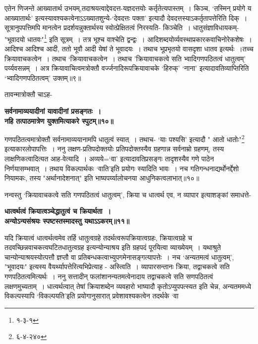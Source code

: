 {{एतेन णिजन्ते आख्यातार्थ उभयम्,तदाश्रयत्वाद्देवदत्त-यज्ञदत्तयोः कर्तृतेत्यपास्तम्~।
 किञ्च, `तस्मिन् प्रयोगे य आख्यातार्थः' इत्यस्यावश्यकत्वेनाऽऽख्यातशुन्ये-`देवदत्तः पक्ता' इत्यादौ देवदत्तस्याऽकर्तृतापत्तेरिति दिक्~।
 सूत्रानुपपत्तिमपि मानत्वेन प्रदर्शयन्नुक्तार्थस्य स्वोत्प्रेक्षितत्वं निरस्यति- किञ्चेति~।
धातुसंज्ञाविधायकम्-"भूवादयो धातवः"\footnote{१-३-१} इति सूत्रम्~।
तत्र भूश्च वाश्चेति द्वन्द्वः~।
आदिशब्दयोर्व्यवस्थाप्रकारकवाचिनोरेकशेषः~।
आदिश्च आदिश्च आदी, ततो भूवौ आदी येषां ते भूवादयः~।
तथाच भूप्रभृतयो वासदृशा धातव इत्यर्थः~।तच्च क्रियावाचकत्वेन~।
तथाच `क्रियावाचकत्वेन~।
तथाच 'क्रियावाचकत्वे सति भ्वादिगणपठितत्वं धातुत्वम्' पर्य्यवसन्नम्~।
अत्र क्रियावाचित्वमत्रोक्तौ वर्ज्जनादिरूपक्रियावाचके `हिरुक्' `नाना' इत्यादावतिव्याप्तिरिति `भ्वादिगणपठितत्वम्' उक्तम्॥९॥\par
तावन्मात्रोक्तौ चाऽह-
\begin{center}{\bfseries सर्वनामाव्ययादीनां यावादीनां प्रसङ्गतः~।\\
 नहि तत्पाठमात्रेण युक्तमित्याकरे स्पुटम्॥१०॥}
\end{center} 
गणपठितत्वमात्रोक्तौ सर्वनामाव्ययानामपि धातुत्वं स्यात्~।
तथाच- `याः पश्यसि' इत्यादौ " आतो धातोः"\footnote{६-४-२४०} इत्याकारलोपापत्तिः~।
ननु लक्षण-प्रतिपदोक्तयोः प्रतिपदोक्तस्यैव ग्रहणान्न सर्वनाम्रो ग्रहणम्, तस्य लाक्षणिकत्वादित्यत आह-वेत्यादि~।
 अव्यये=`वा' इत्यादावतिप्रसङ्गः तादृशस्यैव गणे पाठेन निर्णयासम्भवात्~।
तथाय विकल्पार्थकः `वाति'इति प्रयोगः स्यादिति भावः~।
नच गतिगन्धनाद्यर्थोनर्द्देशो नियामकः, तस्य "अर्थानादेशनात्" इति भाष्यपर्य्यालोचनया आधुनिकत्वलाभात्॥१०॥\par
नन्वस्तु `क्रियावाचकत्वे सति गणपठितत्वं धातुत्वम्', क्रिया च धात्वर्थ एव, न व्यापार इत्याशङ्कां समाधत्ते-
\begin{center}{\bfseries धात्वर्थत्वं क्रियात्वञ्चेद्धातुत्वं च क्रियार्थता~।\\
 अन्योऽन्यसंश्रयः स्पष्टस्तस्मादस्तु यथाऽऽकरम्॥११॥}
\end{center}
यदि क्रियात्वं धात्वर्थत्वमेव तर्हि धातुत्वग्रहे तदर्थत्वरूपक्रियात्वग्रहः, क्रियात्वग्रहे च तदवच्छिन्नवाचकत्वघटितधातुत्वग्रह इत्यन्योन्याश्रय इति ग्रहपदं पूरयित्वा व्याख्येयम्~।
यथाश्रुते चान्योन्याश्रयस्योत्पत्तौ ज्ञप्तौ वा प्रतिबन्धकत्वाभ्युपगमेनासङ्गत्यापत्तेः~।
 नच `अन्यतमत्वं धातुत्वम्', "भूवादयः" इत्यस्य वैयर्थ्यापत्तेरित्यभिप्रेत्याह - अस्त्विति~।
व्यापारसन्तानः क्रिया, तद्वाचकत्वे सति गणपठितत्वमित्यर्थः~।
ननु सत्तादीन् फलांशानन्यतमत्वेनादाय तद्वाचकत्वे सति सणपठितत्वं लक्षणमुच्यताम्~।
धात्वर्थत्वात् तेषां क्रियाशब्देन व्यवहारो भाष्यादौ कृतोऽप्युपपत्स्यत इति चेन्न, अन्यतममध्ये विकल्पस्यापि `विकल्पयति'इति प्रयोगानुसारात् प्रवेशावश्यकत्वेन तदर्थके `वा
}}
